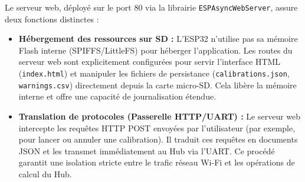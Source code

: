 Le serveur web, déployé sur le port 80 via la librairie \texttt{ESPAsyncWebServer}, assure deux fonctions distinctes :
\begin{itemize}
    \item \textbf{Hébergement des ressources sur SD :} L'ESP32 n'utilise pas sa mémoire Flash interne (SPIFFS/LittleFS) pour héberger l'application. Les routes du serveur web sont explicitement configurées pour servir l'interface HTML (\texttt{index.html}) et manipuler les fichiers de persistance (\texttt{calibrations.json}, \texttt{warnings.csv}) directement depuis la carte micro-SD. Cela libère la mémoire interne et offre une capacité de journalisation étendue.
    \item \textbf{Translation de protocoles (Passerelle HTTP/UART) :} Le serveur web intercepte les requêtes HTTP POST envoyées par l'utilisateur (par exemple, pour lancer ou annuler une calibration). Il traduit ces requêtes en documents JSON et les transmet immédiatement au Hub via l'UART. Ce procédé garantit une isolation stricte entre le trafic réseau Wi-Fi et les opérations de calcul du Hub.
\end{itemize}